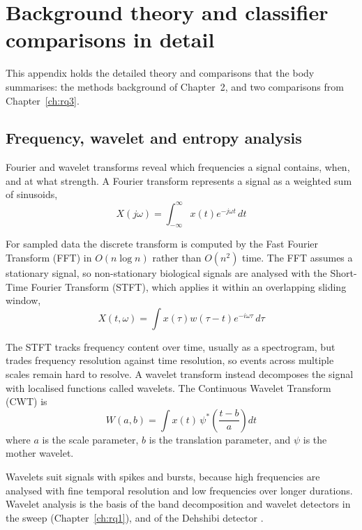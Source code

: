 \chapter{Background theory and classifier comparisons in detail}
\label{app:background}

This appendix holds the detailed theory and comparisons that the body summarises: the methods background of Chapter~2, and two comparisons from Chapter~\ref{ch:rq3}.

\section{Frequency, wavelet and entropy analysis}
\label{sec:frequency}

Fourier and wavelet transforms reveal which frequencies a signal contains, when, and at what strength. A Fourier transform represents a signal as a weighted sum of sinusoids,
\begin{equation}
X(j\omega) = \int_{-\infty}^{\infty} x(t) e^{-j\omega t}\,dt
\end{equation}

For sampled data the discrete transform is computed by the Fast Fourier Transform (FFT) in $O(n \log n)$ rather than $O(n^2)$ time. The FFT assumes a stationary signal, so non-stationary biological signals are analysed with the Short-Time Fourier Transform (STFT), which applies it within an overlapping sliding window,
\begin{equation}
X(t,\omega) = \int x(\tau) w(\tau - t) e^{-i\omega\tau}\,d\tau
\end{equation}

The STFT tracks frequency content over time, usually as a spectrogram, but trades frequency resolution against time resolution, so events across multiple scales remain hard to resolve. A wavelet transform instead decomposes the signal with localised functions called wavelets. The Continuous Wavelet Transform (CWT) is
\begin{equation}
W(a,b) = \int x(t)\,\psi^{*}\!\left(\frac{t-b}{a}\right)dt
\end{equation}
where $a$ is the scale parameter, $b$ is the translation parameter, and $\psi$ is the mother wavelet.

Wavelets suit signals with spikes and bursts, because high frequencies are analysed with fine temporal resolution and low frequencies over longer durations. Wavelet analysis is the basis of the band decomposition and wavelet detectors in the sweep (Chapter~\ref{ch:rq1}), and of the Dehshibi detector \cite{dehshibi}.

